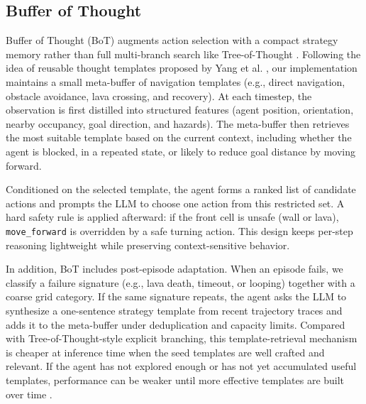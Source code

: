 \subsection{Buffer of Thought}
Buffer of Thought (BoT) augments action selection with a compact strategy memory rather than full multi-branch search like Tree-of-Thought \cite{yao2023tree}. Following the idea of reusable thought templates proposed by Yang et al. \cite{yang2024buffer}, our implementation maintains a small meta-buffer of navigation templates (e.g., direct navigation, obstacle avoidance, lava crossing, and recovery). At each timestep, the observation is first distilled into structured features (agent position, orientation, nearby occupancy, goal direction, and hazards). The meta-buffer then retrieves the most suitable template based on the current context, including whether the agent is blocked, in a repeated state, or likely to reduce goal distance by moving forward.

Conditioned on the selected template, the agent forms a ranked list of candidate actions and prompts the LLM to choose one action from this restricted set. A hard safety rule is applied afterward: if the front cell is unsafe (wall or lava), \texttt{move\_forward} is overridden by a safe turning action. This design keeps per-step reasoning lightweight while preserving context-sensitive behavior.

In addition, BoT includes post-episode adaptation. When an episode fails, we classify a failure signature (e.g., lava death, timeout, or looping) together with a coarse grid category. If the same signature repeats, the agent asks the LLM to synthesize a one-sentence strategy template from recent trajectory traces and adds it to the meta-buffer under deduplication and capacity limits. Compared with Tree-of-Thought-style explicit branching, this template-retrieval mechanism is cheaper at inference time when the seed templates are well crafted and relevant. If the agent has not explored enough or has not yet accumulated useful templates, performance can be weaker until more effective templates are built over time \cite{yang2024buffer}.

